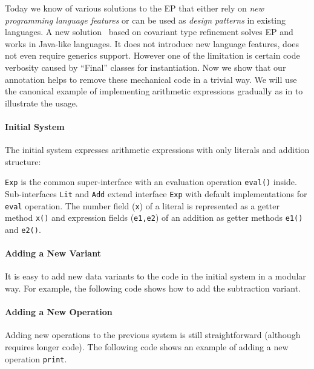 Today we know of various solutions to the EP that either rely on \emph{new
  programming language features}
or can be used as \emph{design patterns}%
in existing languages. 
A new solution~\cite{eptrivially} based on covariant type refinement solves EP
and works in Java-like languages. It does not introduce new language features,
does not even require generics support. However one of the limitation is certain
code verbosity caused by ``Final'' classes for instantiation. Now we show that
our \mixin annotation helps to remove these mechanical code in a trivial way. We
will use the canonical example of implementing arithmetic expressions gradually
as in \cite{eptrivially} to illustrate the usage.

\paragraph{Initial System}
The initial system expresses arithmetic expressions with only literals and
addition structure:


\texttt{Exp} is the common super-interface with an evaluation operation
\texttt{eval()} inside. Sub-interfaces \texttt{Lit} and \texttt{Add} extend
interface \texttt{Exp} with default implementations for \texttt{eval}
operation. The number field (\texttt{x}) of a literal is represented as a getter
method \texttt{x()} and expression fields (\texttt{e1,e2}) of an addition as
getter methods \texttt{e1()} and \texttt{e2()}.

\paragraph{Adding a New Variant}
It is easy to add new data variants to the code in the initial system in a
modular way. For example, the following code shows how to add the subtraction
variant.



\paragraph{Adding a New Operation}
Adding new operations to the previous system is still straightforward (although
requires longer code). The following code shows an example of adding a new
operation \texttt{print}.

